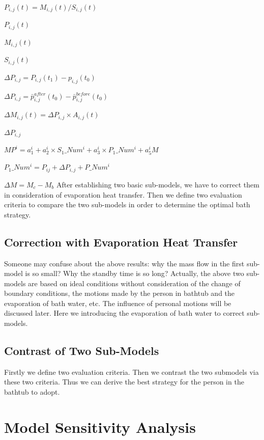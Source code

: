 \documentclass{mcmthesis}
\begin{document}
$P_{i, j}(t) = M_{i, j}(t) / S_{i, j}(t)$

$P_{i, j}(t)$

$M_{i, j}(t)$

$S_{i, j}(t)$

$\Delta P_{i, j} = P_{i, j}(t_{1}) - p_{i, j}(t_{0})$

$\Delta P_{i, j} = \bar{p}_{i, j}^{after}(t_{0}) - \bar{p}_{i, j}^{before}(t_{0})$

$\Delta M_{i, j}(t) = \Delta P_{i, j} \times A_{i, j}(t)$

$\Delta P_{i, j}$

$MP^{i} = a_{1} ^ {i} + a_{2} ^{i}\times S_{1}\_Num^{i} + a_{3}^{i}\times P_{1}\_Num^{i} + a_{5}^{i}M$

$P_{1}\_Num^{i}=P_{ij} + \Delta P_{i, j} + P\_Num^{i}$

$\Delta M=M_{c} - M_{b}$
After establishing two basic sub-models, we have to correct them in consideration of evaporation heat transfer. Then we define two evaluation criteria to compare the two sub-models in order to determine the optimal bath strategy.

\subsection{Correction with Evaporation Heat Transfer}

Someone may confuse about the above results: why the mass flow in the first sub-model is so small? Why the standby time is so long? Actually, the above two sub-models are based on ideal conditions without consideration of the change of boundary conditions, the motions made by the person in bathtub and the evaporation of bath water, etc. The influence of personal motions will be discussed later. Here we introducing the evaporation of bath water to correct sub-models.

\subsection{Contrast of Two Sub-Models}

Firstly we define two evaluation criteria. Then we contrast the two submodels via these two criteria. Thus we can derive the best strategy for the person in the bathtub to adopt.

\section{Model Sensitivity Analysis}
\end{document}

